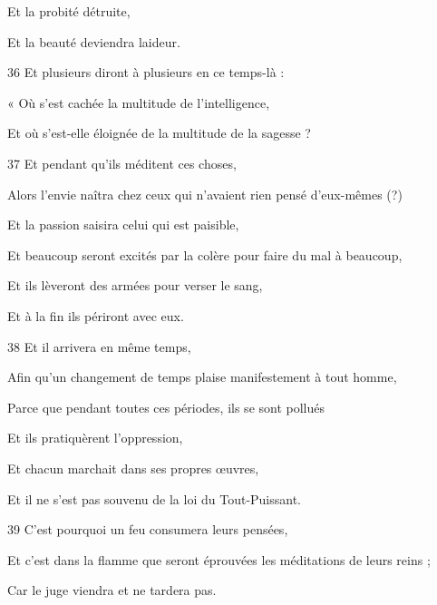 \par Et la probité détruite,

\par Et la beauté deviendra laideur.

\par 36 Et plusieurs diront à plusieurs en ce temps-là :

\par « Où s'est cachée la multitude de l'intelligence,

\par Et où s’est-elle éloignée de la multitude de la sagesse ?

\par 37 Et pendant qu'ils méditent ces choses,

\par Alors l'envie naîtra chez ceux qui n'avaient rien pensé d'eux-mêmes (?)

\par Et la passion saisira celui qui est paisible,

\par Et beaucoup seront excités par la colère pour faire du mal à beaucoup,

\par Et ils lèveront des armées pour verser le sang,

\par Et à la fin ils périront avec eux.

\par 38 Et il arrivera en même temps,

\par Afin qu'un changement de temps plaise manifestement à tout homme,

\par Parce que pendant toutes ces périodes, ils se sont pollués

\par Et ils pratiquèrent l'oppression,

\par Et chacun marchait dans ses propres œuvres,

\par Et il ne s'est pas souvenu de la loi du Tout-Puissant.

\par 39 C'est pourquoi un feu consumera leurs pensées,

\par Et c'est dans la flamme que seront éprouvées les méditations de leurs reins ;

\par Car le juge viendra et ne tardera pas.

